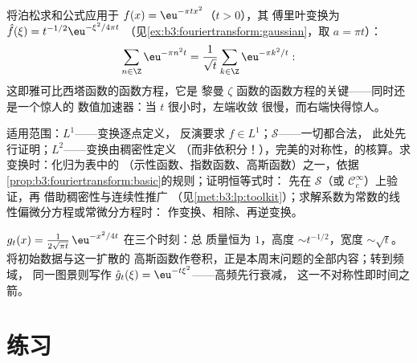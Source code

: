 \begin{example}
\label{ex:b3:fouriertransform:theta}
将泊松求和公式应用于 $f(x) = \eu^{-\pi tx^2}$（$t > 0$），其
傅里叶变换为 $\hat f(\xi) = t^{-1/2}\eu^{-\xi^2/4\pi t}$
（见\cref{ex:b3:fouriertransform:gaussian}，取 $a = \pi t$）：
\[
\sum_{n\in\Z}\eu^{-\pi n^2t}
= \frac1{\sqrt t}\sum_{k\in\Z}\eu^{-\pi k^2/t} :
\]
这即雅可比西塔函数的函数方程，它是
黎曼 $\zeta$ 函数的函数方程的关键——同时还是一个惊人的
数值加速器：当 $t$ 很小时，左端收敛
很慢，而右端快得惊人。
\end{example}

\begin{method}\label{met:b3:fouriertransform:method}
适用范围：$L^1$——变换逐点定义，
反演要求 $\hat f \in L^1$；$\mathcal S$——一切都合法，
此处先行证明；$L^2$——变换由稠密性定义
（而非依积分！），完美的对称性，的核算。求变换时：化归为表中的
（示性函数、指数函数、高斯函数）之一，依据
\cref{prop:b3:fouriertransform:basic}的规则；证明恒等式时：
先在 $\mathcal S$（或 $\mathcal C_c^\infty$）上验证，再
借助稠密性与连续性推广
（见\cref{met:b3:lp:toolkit}）；求解系数为常数的线性偏微分方程或常微分方程时：
作变换、相除、再逆变换。
\end{method}

\begin{omfigure}

{\small {} $g_t(x) =
\frac1{2\sqrt{\pi t}}\,\eu^{-x^2/4t}$ 在三个时刻：总
质量恒为 $1$，高度 $\sim t^{-1/2}$，宽度 $\sim
\sqrt t$。将初始数据与这一扩散的
高斯函数作卷积，正是本周末问题的全部内容；转到频域，
同一图景则写作
$\hat g_t(\xi) = \eu^{-t\xi^2}$——高频先行衰减，
这一不对称性即时间之箭。}
\end{omfigure}

\section{练习}

